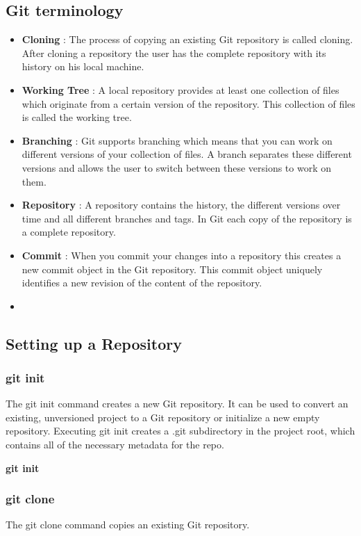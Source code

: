\documentclass{article}
\begin{document}
	\subsection{Git terminology}
	\begin{itemize}
    \item \textbf{Cloning} : The process of copying an existing Git repository is called cloning. After cloning a repository the user has the complete repository with its history on his local machine. 
    \item \textbf{Working Tree} : A local repository provides at least one collection of files which originate from a certain version of the repository. This collection of files is called the working tree.
    \item \textbf{Branching} : Git supports branching which means that you can work on different versions of your collection of files. A branch separates these different versions and allows the user to switch between these versions to work on them.
    \item \textbf{Repository} : A repository contains the history, the different versions over time and all different branches and tags. In Git each copy of the repository is a complete repository.
    \item \textbf{Commit} : When you commit your changes into a repository this creates a new commit object in the Git repository. This commit object uniquely identifies a new revision of the content of the repository.
	\item
	\end{itemize}
	
	\subsection{Setting up a Repository}
	\subsubsection{git init}
    The git init command creates a new Git repository. It can be used to convert an existing, unversioned project to a Git repository or initialize a new empty repository.  Executing git init creates a .git subdirectory in the project root, which contains all of the necessary metadata for the repo. 
        
    \textbf{git init}
	\subsubsection{git clone}
    The git clone command copies an existing Git repository. 
    
\end{document}

